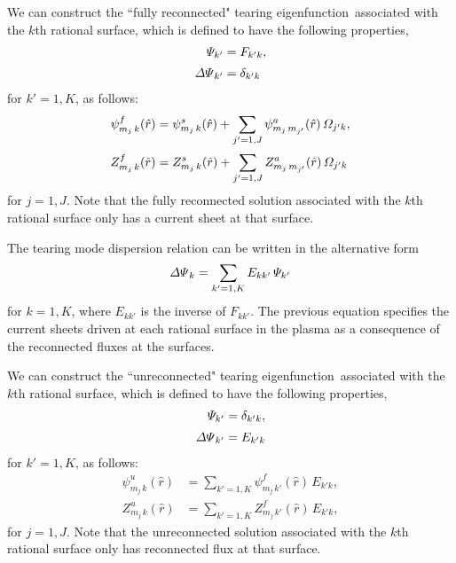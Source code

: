 \documentclass[12pt,prb,aps]{revtex4-1}
\begin{document}
We can construct the ``fully reconnected" tearing eigenfunction\,\cite{am1} associated with the $k$th rational surface,
which is defined to have the following properties, 
\begin{align}
{\mit\Psi}_{k' }&= F_{k'k},\\[0.5ex]
{\mit\Delta\Psi}_{k'} &= \delta_{k'k}
\end{align}
for $k'=1,K$, 
as follows: 
\begin{align}
\psi_{m_j\,k}^{f}(\hat{r}) &=\psi^s_{m_j\,k}(\hat{r})+ \sum_{j'=1,J}\psi_{m_j\,m_{j'}}^a(\hat{r})\,{\mit\Omega}_{j'k},\\[0.5ex]
Z_{m_j\,k}^{f}(\hat{r}) &=Z^s_{m_j\,k}(\hat{r})+ \sum_{j'=1,J}Z_{m_j\,m_{j'}}^a(\hat{r})\,{\mit\Omega}_{j'k}
\end{align}
for $j=1,J$. Note that the fully reconnected solution associated with the $k$th rational surface only has a current sheet at that surface. 

The tearing mode dispersion relation can be written in the alternative form\,\cite{cht,am1}
\begin{equation}\label{e317}
{\mit\Delta\Psi}_k = \sum_{k'=1,K}E_{kk'}\,{\mit\Psi}_{k'}
\end{equation}
for $k=1,K$, where $E_{kk'}$ is the inverse of $F_{kk'}$. The previous equation specifies the current sheets driven at each rational surface
in the plasma as a consequence of the reconnected fluxes at the surfaces. 

We can construct the ``unreconnected" tearing eigenfunction\,\cite{am1} associated with the $k$th rational surface,
which is defined to have the following properties, 
\begin{align}
{\mit\Psi}_{k' }&= \delta_{k'k},\\[0.5ex]
{\mit\Delta\Psi}_{k'} &= E_{k'k}
\end{align}
for $k'=1,K$, 
as follows: 
\begin{align}
\psi_{m_j\,k}^{u}(\hat{r}) &=\sum_{k'=1,K}\psi_{m_j\,k'}^{f}(\hat{r})\,E_{k'k},\\[0.5ex]
Z_{m_j\,k}^{u}(\hat{r}) &=\sum_{k'=1,K}Z_{m_j\,k'}^{f}(\hat{r})\,E_{k'k},
\end{align}
for $j=1,J$.  Note that the unreconnected solution associated with the $k$th rational surface only has reconnected flux at that surface. 
\end{document}
